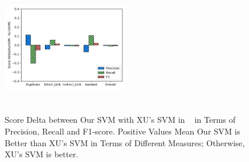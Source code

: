 \documentclass[sigconf]{acmart}
\theoremstyle{break}
\begin{document}


\begin{figure}[!htp]
    \centering
     \includegraphics[width=0.49\textwidth,height=2.3in]{pic/OurSVM-Xu'sSVM.pdf} %
    \caption{Score Delta between Our SVM with XU's SVM in ~\cite{xu2016predicting} in Terms of Precision, Recall and F1-score. Positive Values Mean
            Our SVM is Better than XU's SVM in Terms of Different Measures; Otherwise, XU's SVM is better.}
    \label{fig:OurSVM-Xu'sSVM}
\end{figure}
\end{document}
